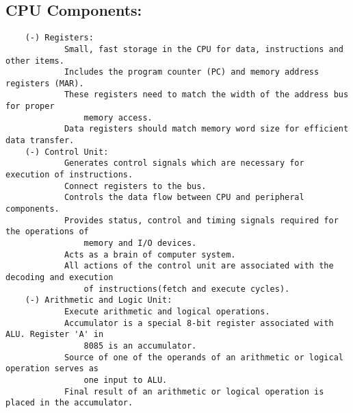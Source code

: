 \documentclass{article}
\begin{document}
\subsection*{CPU Components:}
\begin{verbatim}
    (-) Registers:
            Small, fast storage in the CPU for data, instructions and other items.
            Includes the program counter (PC) and memory address registers (MAR).
            These registers need to match the width of the address bus for proper 
                memory access.
            Data registers should match memory word size for efficient data transfer.
    (-) Control Unit:
            Generates control signals which are necessary for execution of instructions.
            Connect registers to the bus.
            Controls the data flow between CPU and peripheral components.
            Provides status, control and timing signals required for the operations of
                memory and I/O devices.
            Acts as a brain of computer system.
            All actions of the control unit are associated with the decoding and execution
                of instructions(fetch and execute cycles).
    (-) Arithmetic and Logic Unit:
            Execute arithmetic and logical operations.
            Accumulator is a special 8-bit register associated with ALU. Register 'A' in
                8085 is an accumulator.
            Source of one of the operands of an arithmetic or logical operation serves as
                one input to ALU.
            Final result of an arithmetic or logical operation is placed in the accumulator.
\end{verbatim}
\end{document}
